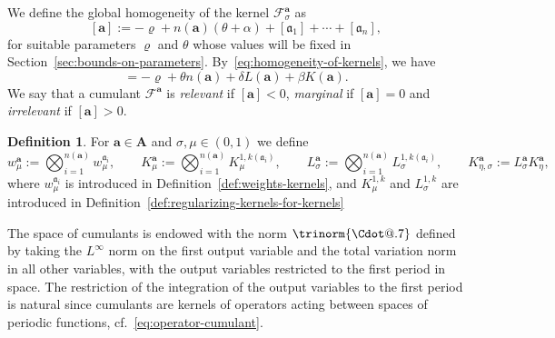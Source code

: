 \documentclass{article}
\makeatletter
\numberwithin{equation}{section}
\newcommand{\assign}{:=}
\newcommand*\Cdot{{\mathpalette\Cdot@{.7}}}
\newcommand*\Cdot@[2]{\mathbin{\vcenter{\hbox{\scalebox{#2}{\hspace{0.1mm}$\m@th#1\bullet$\hspace{0.1mm}}}}}}
\theoremstyle{plain}
\theoremstyle{definition}
\newtheorem{definition}[theorem]{Definition}
\makeatother
\begin{document}
We define the global homogeneity of the kernel
$\mathcal{F}_{\sigma}^{\boldsymbol{a}}$ as
\[ [\boldsymbol{a}] \assign - \varrho + n (\boldsymbol{a}) (\theta + \alpha) +
   [\mathfrak{a}_1] + \cdots + [\mathfrak{a}_n], \]
for suitable parameters $\varrho$ and $\theta$ whose values will be fixed in
Section~\ref{sec:bounds-on-parameters}. By~\eqref{eq:homogeneity-of-kernels}, we
have
\begin{equation}
  [\boldsymbol{a}] = - \varrho + \theta n (\boldsymbol{a}) + \delta L
  (\boldsymbol{a}) + \beta K (\boldsymbol{a}) . \label{eq:homogeneity-cum}
\end{equation}
We say that a cumulant $\mathcal{F}^{\boldsymbol{a}}$ is \textit{relevant} if
$[\boldsymbol{a}] < 0$, \textit{marginal} if $[\boldsymbol{a}] = 0$ and
\textit{irrelevant} if $[\boldsymbol{a}] > 0$.

\begin{definition}
  For $\boldsymbol{a} \in \boldsymbol{A}$ and $\sigma, \mu \in (0, 1)$ we define
  \[ {w^{\boldsymbol{a}}_{\mu}}  \assign \bigotimes_{i = 1}^{n (\boldsymbol{a})}
     {w^{\mathfrak{a}_i}_{\mu}} , \qquad K^{\boldsymbol{a}}_{\mu} \assign
     \bigotimes_{i = 1}^{n (\boldsymbol{a})} K^{1, k (\mathfrak{a}_i)}_{\mu},
     \qquad L^{\boldsymbol{a}}_{\sigma} \assign \bigotimes_{i = 1}^{n
     (\boldsymbol{a})} L^{1, k (\mathfrak{a}_i)}_{\sigma}, \qquad
     K^{\boldsymbol{a}}_{\eta, \sigma} \assign L^{\boldsymbol{a}}_{\sigma}
     K^{\boldsymbol{a}}_{\eta}, \]
  where ${w^{\mathfrak{a}_i}_{\mu}}$ is introduced in
  Definition~\ref{def:weights-kernels}, and $K^{1, k}_{\mu}$ and $L^{1, k}_{\sigma}$
  are introduced in Definition~\ref{def:regularizing-kernels-for-kernels}
\end{definition}

The space of cumulants is endowed with the norm $\trinorm{\Cdot}$ defined by taking the $L^{\infty}$ norm on the first output variable
and the total variation norm in all other variables, with the output variables
restricted to the first period in space. The restriction of the integration of
the output variables to the first period is natural since cumulants are
kernels of operators acting between spaces of periodic functions,
cf.~\eqref{eq:operator-cumulant}.
\end{document}
